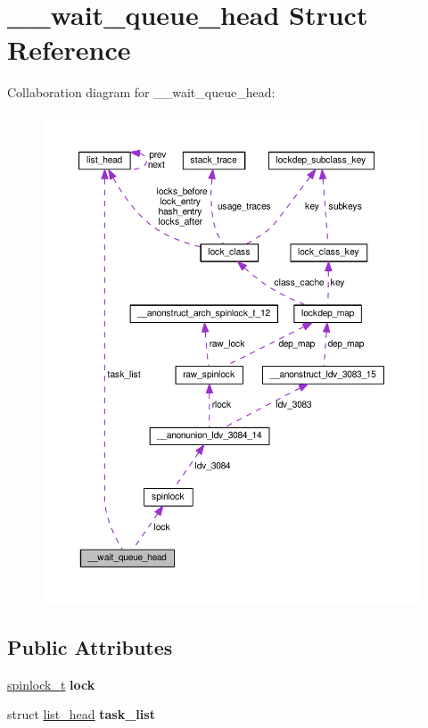 \hypertarget{struct____wait__queue__head}{}\section{\+\_\+\+\_\+wait\+\_\+queue\+\_\+head Struct Reference}
\label{struct____wait__queue__head}


Collaboration diagram for \+\_\+\+\_\+wait\+\_\+queue\+\_\+head\+:
\nopagebreak
\begin{figure}[H]
\begin{center}
\leavevmode
\includegraphics[width=350pt]{struct____wait__queue__head__coll__graph}
\end{center}
\end{figure}
\subsection*{Public Attributes}
\begin{DoxyCompactItemize}
\item 
\hypertarget{struct____wait__queue__head_adf42be939d08269f467f1501a060f6fd}{}\hyperlink{structspinlock}{spinlock\+\_\+t} {\bfseries lock}\label{struct____wait__queue__head_adf42be939d08269f467f1501a060f6fd}

\item 
\hypertarget{struct____wait__queue__head_a37e23fce7f99bb98e21809d9f9ebf9f0}{}struct \hyperlink{structlist__head}{list\+\_\+head} {\bfseries task\+\_\+list}\label{struct____wait__queue__head_a37e23fce7f99bb98e21809d9f9ebf9f0}

\end{DoxyCompactItemize}


